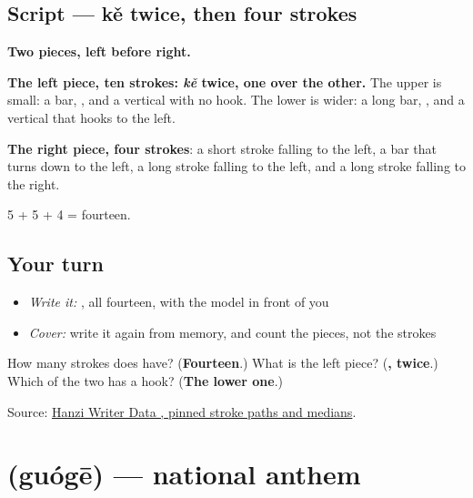 \subsection*{Script — kě twice, then four strokes}

\begin{quote}
\end{quote}

\textbf{Two pieces, left before right.}

\textbf{The left piece, ten strokes:  \emph{kě} twice, one over the other.} The upper  is small: a bar, , and a vertical with no hook. The lower  is wider: a long bar, , and a vertical that hooks to the left.

\textbf{The right piece, four strokes}: a short stroke falling to the left, a bar that turns down to the left, a long stroke falling to the left, and a long stroke falling to the right.

5 + 5 + 4 = fourteen.

\subsection*{Your turn}
\begin{itemize}
\raggedright
  \item \emph{Write it:} , all fourteen, with the model in front of you
  \item \emph{Cover:} write it again from memory, and count the pieces, not the strokes
\end{itemize}

\begin{tcolorbox}[breakable,colback=teal!4,colframe=teal!35!black,title={Before you move on}]
How many strokes does  have? (\textbf{Fourteen}.) What is the left piece? (\textbf{, twice}.) Which of the two has a hook? (\textbf{The lower one}.)

Source: \href{https://raw.githubusercontent.com/chanind/hanzi-writer-data/68d10a4b21150cae5e1ebbd223eed289cf32d90c/data/\%E6\%AD\%8C.json}{Hanzi Writer Data , pinned stroke paths and medians}.
\end{tcolorbox}
\section[\texorpdfstring{\zh{国歌} (guógē)}{国歌 (guógē)}]{ (guógē) — national anthem}

